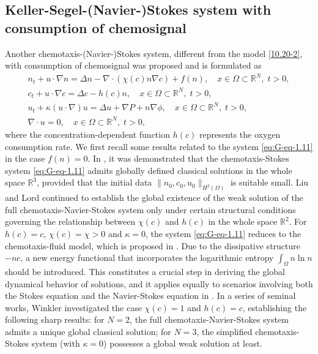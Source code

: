 \documentclass[reqno]{amsart}
\begin{document}
\subsection*{Keller-Segel-(Navier-)Stokes system with consumption of chemosignal} 
Another chemotaxis-(Navier-)Stokes system, different from the model \eqref{10.20-2}, 
with consumption of chemosignal was proposed and is formulated as 
\begin{equation}\label{eq:G-eq-1.11}
\begin{gathered}
n_t + u \cdot \nabla n = \Delta n -\nabla \cdot ( \chi(c) n \nabla c) + f(n), \quad
 x \in \Omega\subset \mathbb{R}^N,\; t > 0, \\
c_t + u \cdot \nabla c = \Delta c - h(c) n, \quad
 x \in \Omega\subset \mathbb{R}^N,\; t > 0, \\
u_t + \kappa ( u \cdot \nabla ) u = \Delta u + \nabla P + n \nabla \phi, \quad
 x \in \Omega\subset \mathbb{R}^N,\; t > 0, \\
\nabla \cdot u = 0, \quad x \in \Omega\subset \mathbb{R}^N,\; t > 0,
\end{gathered}
\end{equation}
where the concentration-dependent function $h(c)$ represents the oxygen consumption 
rate. We first recall some results related to the system \eqref{eq:G-eq-1.11} 
in the case $f(n)=0$. In \cite{G-8}, it was demonstrated that the
chemotaxis-Stokes system \eqref{eq:G-eq-1.11} admits globally defined classical 
solutions in the whole space $\mathbb{R}^3$, provided that the initial data 
$\|n_0, c_0, u_0\|_{H^3(\Omega)}$ is suitable small. Liu and Lord
\cite{s1468-17} continued to establish the global existence of the weak solution of 
the full chemotaxis-Navier-Stokes system only under
certain structural conditions governing the relationship between $\chi(c)$ and 
$h(c)$ in the whole space $\mathbb{R}^2$. For $ h(c) = c $, $ \chi(c) = \chi >0 $ and 
$ \kappa = 0 $, the system \eqref{eq:G-eq-1.11} reduces to the chemotaxis-fluid model,
which is proposed in \cite{Tuval-2005}. Due to the dissipative structure $-nc$, 
a new energy functional that incorporates the logarithmic entropy $\int_\Omega
n \ln n$ should be introduced. This constitutes a crucial step in deriving the 
global dynamical behavior of solutions, and it applies equally to
scenarios involving both the Stokes equation and the Navier-Stokes equation 
in \cite{W2020-28,W2020-29,W2020-30,W2020-31}.
In a series of seminal works, Winkler investigated the case $\chi(c) = 1 $ and 
$ h(c) = c $, establishing the following sharp results: for $N=2$, the full 
chemotaxis-Navier-Stokes system admits a unique global classical solution; 
for $N=3$, the simplified chemotaxis-Stokes system (with $\kappa=0 $)
possesses a global weak solution at least.
\end{document}
